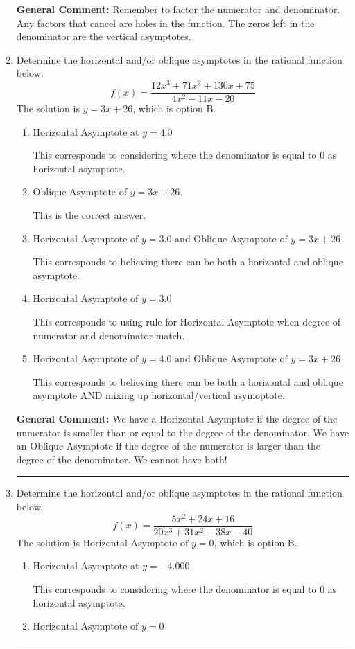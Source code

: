 \documentclass{extbook}[14pt]
\newcommand{\litem}[1]{\item #1

\rule{\textwidth}{0.4pt}}
\begin{document}
\begin{enumerate}
{\textbf{General Comment:} Remember to factor the numerator and denominator. Any factors that cancel are holes in the function. The zeros left in the denominator are the vertical asymptotes.
}
\litem{
Determine the horizontal and/or oblique asymptotes in the rational function below.
\[ f(x) = \frac{12x^{3} +71 x^{2} +130 x + 75}{4x^{2} -11 x -20} \]The solution is \( y = 3x + 26 \), which is option B.\begin{enumerate}[label=\Alph*.]
\item \( \text{Horizontal Asymptote at } y = 4.0 \)

This corresponds to considering where the denominator is equal to 0 as horizontal asymptote.
\item \( \text{Oblique Asymptote of } y = 3x + 26. \)

This is the correct answer.
\item \( \text{Horizontal Asymptote of } y = 3.0 \text{ and Oblique Asymptote of } y = 3x + 26 \)

This corresponds to believing there can be both a horizontal and oblique asymptote.
\item \( \text{Horizontal Asymptote of } y = 3.0  \)

This corresponds to using rule for Horizontal Asymptote when degree of numerator and denominator match.
\item \( \text{Horizontal Asymptote of } y = 4.0 \text{ and Oblique Asymptote of } y = 3x + 26 \)

This corresponds to believing there can be both a horizontal and oblique asymptote AND mixing up horizontal/vertical asymoptote.
\end{enumerate}

\textbf{General Comment:} We have a Horizontal Asymptote if the degree of the numerator is smaller than or equal to the degree of the denominator. We have an Oblique Asymptote if the degree of the numerator is larger than the degree of the denominator. We cannot have both!
}
\litem{
Determine the horizontal and/or oblique asymptotes in the rational function below.
\[ f(x) = \frac{5x^{2} +24 x + 16}{20x^{3} +31 x^{2} -38 x -40} \]The solution is \( \text{Horizontal Asymptote of } y = 0 \), which is option B.\begin{enumerate}[label=\Alph*.]
\item \( \text{Horizontal Asymptote at } y = -4.000 \)

This corresponds to considering where the denominator is equal to 0 as horizontal asymptote.
\item \( \text{Horizontal Asymptote of } y = 0 \)


\end{enumerate}}
\end{enumerate}
\end{document}
